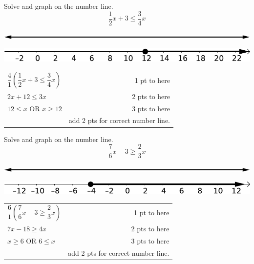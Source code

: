 {
	Solve and graph on the number line. $$\frac{1}{2}x+3 \leq \frac{3}{4}x$$\begin{onlyproblem}\begin{center}\includegraphics{numberLineNoNumbersNoTicks}\end{center}\end{onlyproblem} \begin{onlysolution}\begin{center}\includegraphics{fig095-07-5-a-answer}\end{center}\end{onlysolution}
}
{
	\begin{tabular}{l r}
	$\dfrac{4}{1}\left(\dfrac{1}{2}x+3 \leq \dfrac{3}{4}x\right)$ & 1 pt to here \\
	$2x+12\leq 3x$ & 2 pts to here \\
	$12\leq x$ OR $x\geq 12$ & 3 pts to here \\
	 & add 2 pts for correct number line.
	\end{tabular}
}

{
	Solve and graph on the number line. $$\frac{7}{6}x-3 \geq \frac{2}{3}x$$\begin{onlyproblem}\begin{center}\includegraphics{numberLineNoNumbersNoTicks}\end{center}\end{onlyproblem} \begin{onlysolution}\begin{center}\includegraphics{fig095-07-5-b-answer}\end{center}\end{onlysolution}
}
{
	\begin{tabular}{l r}
	$\dfrac{6}{1}\left(\dfrac{7}{6}x-3 \geq \dfrac{2}{3}x\right)$ & 1 pt to here \\
	$7x-18\geq 4x$ & 2 pts to here \\
	$x\geq 6$ OR $6\leq x$ & 3 pts to here \\
	 & add 2 pts for correct number line.
	\end{tabular}
}

